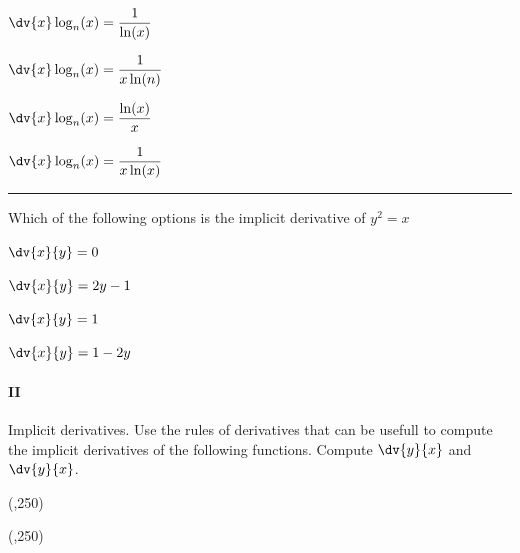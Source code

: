 \begin{preguntas}
\begin{enumerate*}[label=(\alph*)]
    \item \(\dv{x}\log_n(x) = \dfrac{1}{\ln(x)}\)\hspace{2em} 
    \item \(\dv{x}\log_n(x) = \dfrac{1}{x\ln(n)}\)\hspace{2em}
    \item \(\dv{x}\log_n(x) = \dfrac{\ln(x)}{x}\)\hspace{2em}
    \item \(\dv{x}\log_n(x) = \dfrac{1}{x\ln(x)}\)
\end{enumerate*}

\pregunta[4] \rule{1cm}{0.1mm} Which of the following options is the implicit derivative of \(y^2 = x\) 

\begin{enumerate*}[label=(\alph*)]
    \item \(\dv{x}{y}=0\)\hspace{2em} 
    \item \(\dv{x}{y}=2y-1\)\hspace{2em}
    \item \(\dv{x}{y}=1\)\hspace{2em}
    \item \(\dv{x}{y}=1-2y\)
\end{enumerate*}



\end{preguntas}

\newpage

\paragraph{II} Implicit derivatives.
Use the rules of derivatives that can be usefull to compute the implicit derivatives of the following functions. 
Compute \(\dv{y}{x}\) and \(\dv{y}{x}\).

\begin{preguntas}


\begin{center}
    \framebox(\textwidth,250){} 
\end{center}


\begin{center}
    \framebox(\textwidth,250){} 
\end{center}

\end{preguntas}


